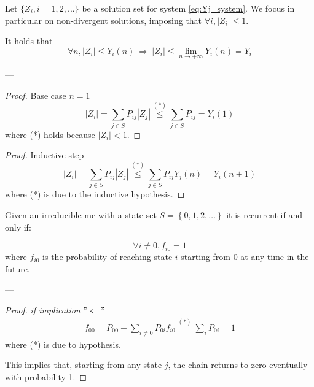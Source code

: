 	\begin{lemma}
		Let $\{Z_i, i=1, 2, ...\}$ be a solution set for system \eqref{eq:Yj_system}. We focus in particular on non-divergent solutions, imposing that $ \forall i, |Z_i| \le 1 $.

		It holds that
		$$ \forall n, |Z_i| \le Y_i(n) ~ \Rightarrow ~|Z_i| \le \lim_{n \to +\infty} Y_i(n) = Y_i $$
	\end{lemma}
	---
	\begin{proof} Base case $n=1$
		$$ |Z_i| = \sum_{j \in S} P_{ij} |Z_j| \stackrel{(*)}{\le} \sum_{j \in S} P_{ij} = Y_i(1) $$
		where (*) holds because $|Z_i| < 1$.
	\end{proof}

	\begin{proof} Inductive step
		$$ |Z_i| = \sum_{j \in S} P_{ij} |Z_j| \stackrel{(*)}{\le} \sum_{j \in S} P_{ij} Y_j(n) = Y_i(n+1) $$
		where (*) is due to the inductive hypothesis.
	\end{proof}

	\begin{lemma}[4.13 (Ross 2, pg. 78-82)] \label{lemma:MC_irreducible_fi0}
		Given an irreducible \gls{mc} with a state set $S=\left\{0,1,2,\dots \right\}$ it is recurrent if and only if:

		$$ \forall i \neq 0, f_{i 0} = 1 $$
		where $f_{i 0}$ is the probability of reaching state $i$ starting from 0 at any time in the future.
	\end{lemma}
	---
	\begin{proof} \emph{if implication} $"\Leftarrow"$
		\begin{equation}\begin{split}
			f_{00} = P_{00} + \sum_{i \neq 0} P_{0i} f_{i 0} \stackrel{(*)}{=} \sum_{i} P_{0i} = 1
		\end{split}\end{equation}
		where (*) is due to hypothesis.

		This implies that, starting from any state $j$, the chain returns to zero eventually with probability 1.
	\end{proof}

